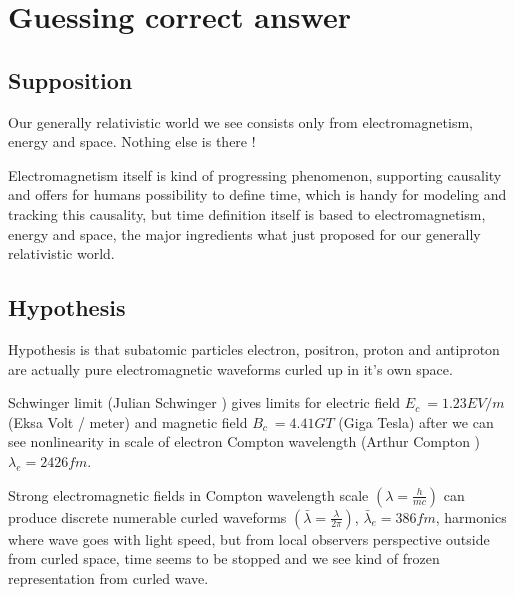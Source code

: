 %
%
%
\begin{comment}\end{comment}
\chapter{Guessing correct answer}
\section{Supposition}
\label{supposition}
Our generally relativistic world we see consists only from electromagnetism,
energy and space. Nothing else is there !

Electromagnetism itself is kind of progressing phenomenon, supporting causality
and offers for humans possibility to define time, which is handy for modeling
and tracking this causality, but time definition itself is based to
electromagnetism, energy and space, the major ingredients what just proposed
for our generally relativistic world.

\section{Hypothesis}
\label{hypothesis}

Hypothesis is that subatomic particles electron, positron, proton and
antiproton are actually pure electromagnetic waveforms curled up in it's own
space.

Schwinger limit (Julian Schwinger \cite{SchwingerLimit}) gives limits for
electric field $E_c~=1.23 EV/m$ (Eksa Volt / meter) and magnetic field
$B_c~=4.41 GT$ (Giga Tesla) after we can see nonlinearity in scale of
electron Compton wavelength (Arthur Compton \cite{ComptonWavelength}) 
$\lambda_e=2426 fm$.


Strong electromagnetic fields in Compton wavelength scale
$(\lambda=\frac{h}{mc})$
can produce discrete numerable curled waveforms
$(\bar{\lambda}=\frac{\lambda}{2\pi})$,
$\bar{\lambda}_e=386 fm$,
harmonics where wave goes with light speed, but from local observers
perspective outside from curled space, time seems to be stopped and we see kind
of frozen representation from curled wave.

